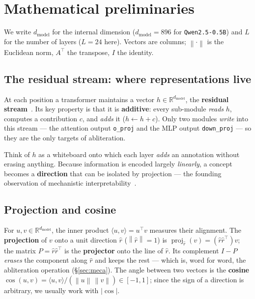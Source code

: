 \documentclass[11pt,a4paper]{article}
\theoremstyle{definition}
\theoremstyle{plain}
\newcommand{\R}{\mathbb{R}}
\newcommand{\rhat}{\hat{r}}
\newcommand{\norm}[1]{\left\lVert #1 \right\rVert}
\newcommand{\inner}[2]{\langle #1, #2 \rangle}
\newcommand{\dmodel}{d_{\text{model}}}
\DeclareMathOperator{\proj}{proj}
\begin{document}
\section{Mathematical preliminaries}\label{sec:prelim}
We write $\dmodel$ for the internal dimension ($\dmodel=896$ for
\texttt{Qwen2.5-0.5B}) and $L$ for the number of layers ($L=24$ here). Vectors are
columns; $\norm{\cdot}$ is the Euclidean norm, $A^\top$ the transpose, $I$ the
identity.

\subsection{The residual stream: where representations live}
At each position a transformer maintains a vector $h\in\R^{\dmodel}$, the
\textbf{residual stream}~\cite{elhage2021}. Its key property is that it is
\textbf{additive}: every sub-module \emph{reads} $h$, computes a contribution $c$,
and \emph{adds} it ($h\leftarrow h+c$). Only two modules \emph{write} into this
stream — the attention output \texttt{o\_proj} and the MLP output
\texttt{down\_proj} — so they are the only targets of abliteration.

\begin{intuition}
Think of $h$ as a whiteboard onto which each layer \emph{adds} an annotation without
erasing anything. Because information is encoded largely \emph{linearly}, a concept
becomes a \textbf{direction} that can be isolated by projection — the founding
observation of mechanistic interpretability~\cite{elhage2021}.
\end{intuition}

\subsection{Projection and cosine}
For $u,v\in\R^{\dmodel}$, the inner product $\inner{u}{v}=u^\top v$ measures their
alignment. The \textbf{projection} of $v$ onto a unit direction $\rhat$
($\norm{\rhat}=1$) is $\proj_{\rhat}(v)=(\rhat\rhat^\top)v$; the matrix
$P=\rhat\rhat^\top$ is the \textbf{projector} onto the line of $\rhat$. Its
complement $I-P$ \emph{erases} the component along $\rhat$ and keeps the rest — which
is, word for word, the abliteration operation (\S\ref{sec:meca}). The angle between
two vectors is the \textbf{cosine}
$\cos(u,v)=\inner{u}{v}/(\norm{u}\,\norm{v})\in[-1,1]$; since the sign of a direction
is arbitrary, we usually work with $\lvert\cos\rvert$.
\end{document}
